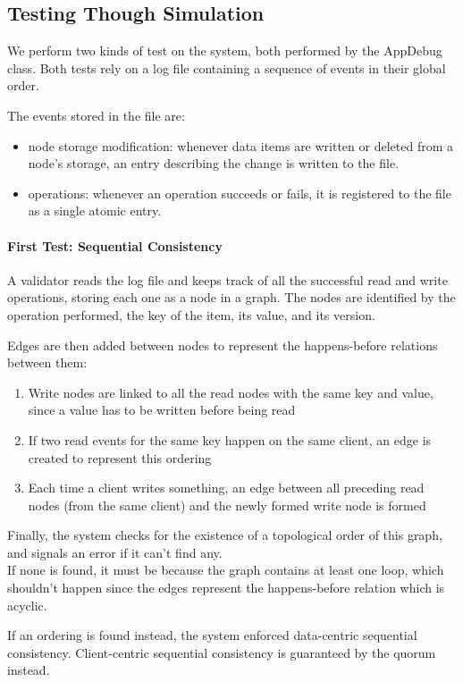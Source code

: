 \documentclass{article}
\begin{document}
\subsection{Testing Though Simulation}
We perform two kinds of test on the system, both performed by the AppDebug class. 
Both tests rely on a log file containing a sequence of events in their global order.

The events stored in the file are:
\begin{itemize}
    \item node storage modification: whenever data items are written or deleted 
    from a node's storage, an entry describing the change is written to the file.
    \item operations: whenever an operation succeeds or fails, it is registered 
    to the file as a single atomic entry.
\end{itemize}

\paragraph {First Test: Sequential Consistency}
A validator reads the log file and keeps track of all the successful read and write
operations, storing each one as a node in a graph. The nodes are identified
by the operation performed, the key of the item, its value, and its version.

Edges are then added between nodes to represent the happens-before relations between them:
\begin{enumerate}
    \item Write nodes are linked to all the read nodes with the same key and value, since
        a value has to be written before being read
    \item If two read events for the same key happen on the same client, an edge is created
        to represent this ordering
    \item Each time a client writes something, an edge between all preceding read nodes (from the same client) and the
        newly formed write node is formed
\end{enumerate}
Finally, the system checks for the existence of a topological order of this graph, and signals an error if it can't find any.\\
If none is found, it must be because the graph contains at least one loop, which shouldn't happen since the edges
represent the happens-before relation which is acyclic.

If an ordering is found instead, the system enforced data-centric sequential consistency. Client-centric sequential consistency is guaranteed by the quorum instead.
\end{document}
